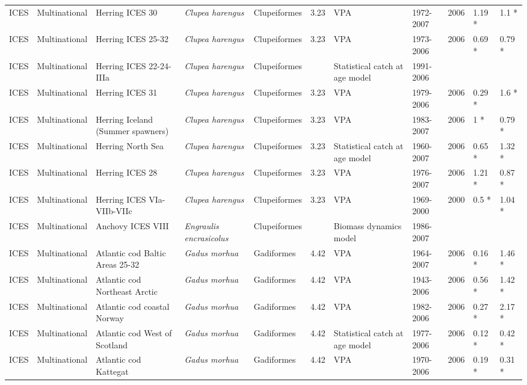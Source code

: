 \begin{longtable}{p{1.5cm}p{1.5cm}p{3cm}p{3cm}p{2.5cm}p{0.9cm}p{1.4cm}p{0.9cm}p{0.9cm}p{0.9cm}p{1cm}}
  ICES & Multinational & Herring ICES 30 & \textit{Clupea harengus} & Clupeiformes & 3.23 & VPA & 1972-2007 & 2006 & 1.19 * & 1.1 * \\ 
  ICES & Multinational & Herring ICES 25-32 & \textit{Clupea harengus} & Clupeiformes & 3.23 & VPA & 1973-2006 & 2006 & 0.69 * & 0.79 * \\ 
  ICES & Multinational & Herring ICES 22-24-IIIa & \textit{Clupea harengus} & Clupeiformes &  & Statistical catch at age model & 1991-2006 &  &  &  \\ 
  ICES & Multinational & Herring ICES 31 & \textit{Clupea harengus} & Clupeiformes & 3.23 & VPA & 1979-2006 & 2006 & 0.29 * & 1.6 * \\ 
  ICES & Multinational & Herring Iceland (Summer spawners) & \textit{Clupea harengus} & Clupeiformes & 3.23 & VPA & 1983-2007 & 2006 & 1 * & 0.79 * \\ 
  ICES & Multinational & Herring North Sea & \textit{Clupea harengus} & Clupeiformes & 3.23 & Statistical catch at age model & 1960-2007 & 2006 & 0.65 * & 1.32 * \\ 
  ICES & Multinational & Herring ICES 28 & \textit{Clupea harengus} & Clupeiformes & 3.23 & VPA & 1976-2007 & 2006 & 1.21 * & 0.87 * \\ 
  ICES & Multinational & Herring ICES VIa-VIIb-VIIc & \textit{Clupea harengus} & Clupeiformes & 3.23 & VPA & 1969-2000 & 2000 & 0.5 * & 1.04 * \\ 
  ICES & Multinational & Anchovy ICES VIII & \textit{Engraulis encrasicolus} & Clupeiformes &  & Biomass dynamics model & 1986-2007 &  &  &  \\ 
  ICES & Multinational & Atlantic cod Baltic Areas 25-32 & \textit{Gadus morhua} & Gadiformes & 4.42 & VPA & 1964-2007 & 2006 & 0.16 * & 1.46 * \\ 
  ICES & Multinational & Atlantic cod Northeast Arctic & \textit{Gadus morhua} & Gadiformes & 4.42 & VPA & 1943-2006 & 2006 & 0.56 * & 1.42 * \\ 
  ICES & Multinational & Atlantic cod coastal Norway & \textit{Gadus morhua} & Gadiformes & 4.42 & VPA & 1982-2006 & 2006 & 0.27 * & 2.17 * \\ 
  ICES & Multinational & Atlantic cod West of Scotland & \textit{Gadus morhua} & Gadiformes & 4.42 & Statistical catch at age model & 1977-2006 & 2006 & 0.12 * & 0.42 * \\ 
  ICES & Multinational & Atlantic cod Kattegat & \textit{Gadus morhua} & Gadiformes & 4.42 & VPA & 1970-2006 & 2006 & 0.19 * & 0.31 * \\ 

\end{longtable}
